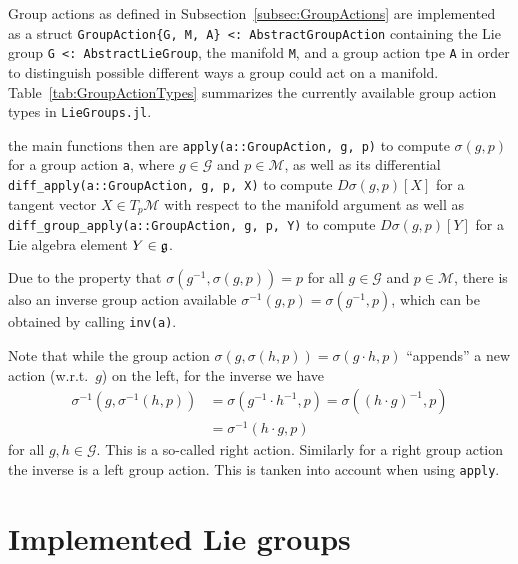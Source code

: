\documentclass{juliacon}
\begin{document}
Group actions as defined in Subsection~\ref{subsec:GroupActions} are implemented as a struct \verb|GroupAction{G, M, A} <: AbstractGroupAction| containing the Lie group \verb|G <: AbstractLieGroup|, the manifold \verb|M|, and a group action tpe \verb|A| in order to distinguish possible different ways a group could act on a manifold.
Table~\ref{tab:GroupActionTypes} summarizes the currently available group action types in \verb|LieGroups.jl|.

the main functions then are \verb|apply(a::GroupAction, g, p)|
to compute \(\sigma(g, p)\) for a group action \verb|a|, where $g\in \mathcal G$ and $p \in \mathcal M$, as well as its differential \verb|diff_apply(a::GroupAction, g, p, X)|
to compute \(D\sigma(g, p)[X]\) for a tangent vector \(X \in T_p\mathcal M\) with respect to the manifold argument as well as \verb|diff_group_apply(a::GroupAction, g, p, Y)|
to compute \(D\sigma(g, p)[Y]\) for a Lie algebra element \(Y \in \frak g\).

Due to the property that \(\sigma(g^{-1}, \sigma(g, p)) = p\) for all \(g \in \mathcal{G}\) and \(p \in \mathcal{M}\), there is also an inverse group action available $\sigma^{-1}(g, p) = \sigma(g^{-1}, p)$, which can be obtained by calling \verb|inv(a)|.

Note that while the group action $\sigma(g, \sigma(h, p)) = \sigma(g \cdot h, p)$ “appends” a new action (w.r.t.~$g$) on the left, for the inverse we have
\begin{align*}
        \sigma^{-1}(g, \sigma^{-1}(h, p))
        &= \sigma(g^{-1}\cdot h^{-1}, p)
        = \sigma((h \cdot g)^{-1}, p)
        \\
        &= \sigma^{-1}(h \cdot g, p)
\end{align*}
for all \(g, h \in \mathcal{G}\). This is a so-called right action.
Similarly for a right group action the inverse is a left group action.
This is tanken into account when using \verb|apply|.

\section{Implemented Lie groups}\label{sec:LieGroups}
\end{document}

